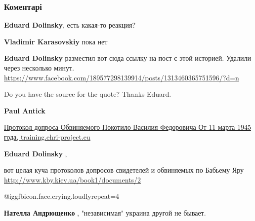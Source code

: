  
 
 
 
 
\subsubsection{Коментарі}
\label{sec:27_09_2021.fb.dolinskij_eduard.1.bogazij_kiev_burgomistr.cmt}

\begin{itemize} %
\textbf{Eduard Dolinsky}, есть какая-то реакция?

\begin{itemize} %
\textbf{Vladimir Karasovskiy} пока нет

\textbf{Eduard Dolinsky} разместил вот сюда ссылку на пост с этой историей. Удалили через несколько минут.
\url{https://www.facebook.com/189577298139914/posts/1313460365751596/?d=n}
\end{itemize} %

Do you have the source for the quote? Thanks Eduard.

\begin{itemize} %
\textbf{Paul Antick}

\href{https://training.ehri-project.eu/sites/training.ehri-project.eu/files/Transcription%20Former%20Policeman%20Vasyl%20Pokotylo%20is%20Questioned%20by%20Soviet%20Interrogators.pdf}{%
Протокол допроса Обвиняемого Покотило Василия Федоровича От 11 марта 1945 года, training.ehri-project.eu%
}

\textbf{Eduard Dolinsky} , 

вот целая куча протоколов допросов свидетелей и обвиняемых по Бабьему Яру
\url{http://www.kby.kiev.ua/book1/documents/2}

\end{itemize} %

 @igg{fbicon.face.crying.loudly}{repeat=4} 

\begin{itemize} %
\textbf{Нателла Андрющенко} , "независимая" украина другой не бывает.


\end{itemize}
\end{itemize}
